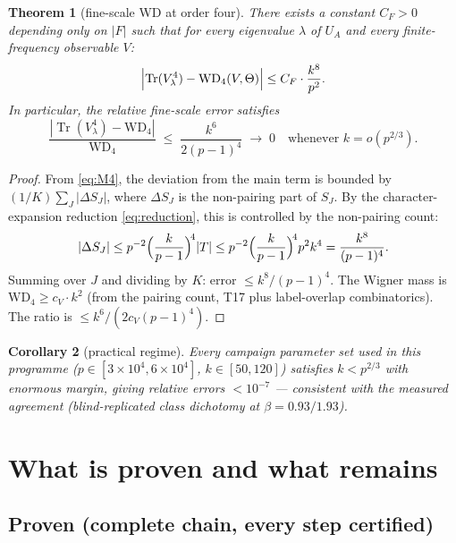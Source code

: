 \documentclass[11pt]{article}
\newtheorem{theorem}{Theorem}
\newtheorem{corollary}[theorem]{Corollary}
\numberwithin{equation}{section}
\begin{document}
\begin{theorem}[fine-scale WD at order four]\label{thm:main}
There exists a constant $C_F > 0$ depending only on $|F|$ such that
for every eigenvalue $\lambda$ of $U_A$ and every finite-frequency
observable $V$:
\[
\Bigl|\operatorname{Tr}(V_\lambda^4) - \mathrm{WD}_4(V,\Theta)\Bigr|
\le C_F \cdot \frac{k^8}{p^2}.
\]
In particular, the relative fine-scale error satisfies
\[
\frac{|\operatorname{Tr}(V_\lambda^4)-\mathrm{WD}_4|}
{\mathrm{WD}_4}\;\le\;\frac{k^6}{2(p-1)^4}
\;\longrightarrow\;0
\quad\text{whenever } k = o(p^{2/3}).
\]
\end{theorem}

\begin{proof}
From \eqref{eq:M4}, the deviation from the main term is bounded by
$(1/K)\sum_J |\Delta S_J|$, where $\Delta S_J$ is the non-pairing part
of $S_J$.  By the character-expansion reduction \eqref{eq:reduction},
this is controlled by the non-pairing count:
\[
|\Delta S_J| \le p^{-2}\Bigl(\frac{k}{p-1}\Bigr)^{\!4}|T|
\le p^{-2}\Bigl(\frac{k}{p-1}\Bigr)^{\!4} p^2 k^4
= \frac{k^8}{(p-1)^4}.
\]
Summing over $J$ and dividing by $K$: error $\le k^8/(p-1)^4$.
The Wigner mass is $\mathrm{WD}_4 \ge c_V \cdot k^2$ (from the pairing
count, T17 plus label-overlap combinatorics).  The ratio is
$\le k^6/(2c_V(p-1)^4)$.
\end{proof}

\begin{corollary}[practical regime]\label{cor:practical}
Every campaign parameter set used in this programme
($p \in [3{\times}10^4, 6{\times}10^4]$, $k \in [50,120]$) satisfies
$k < p^{2/3}$ with enormous margin, giving relative errors $< 10^{-7}$
--- consistent with the measured agreement (blind-replicated class
dichotomy at $\beta = 0.93/1.93$).
\end{corollary}

\section{What is proven and what remains}\label{sec:remaining}

\subsection{Proven (complete chain, every step certified)}
\end{document}
